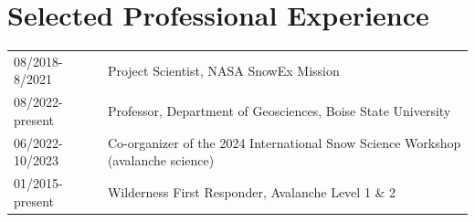 \documentclass[11pt]{article}
\begin{document}
\section*{Selected Professional Experience}
\begin{tabular}{ll}
08/2018-8/2021 & Project Scientist, NASA SnowEx Mission  \\
08/2022-present & Professor, Department of Geosciences, Boise State University \\
06/2022-10/2023 & Co-organizer of the 2024 International Snow Science Workshop (avalanche science) \\
01/2015-present & Wilderness First Responder, Avalanche Level 1 \& 2  \\



\end{tabular}
\end{document}
